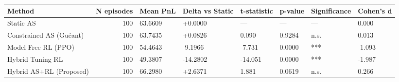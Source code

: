 \begin{tabular}{lrllllll}
\toprule
Method & N episodes & Mean PnL & Delta vs Static & t-statistic & p-value & Significance & Cohen's d \\
\midrule
Static AS & 100 & 63.6609 & +0.0000 & — & — & — & 0.000 \\
Constrained AS (Guéant) & 100 & 63.7435 & +0.0826 & 0.090 & 0.9284 & n.s. & 0.013 \\
Model-Free RL (PPO) & 100 & 54.4643 & -9.1966 & -7.731 & 0.0000 & *** & -1.093 \\
Hybrid Tuning RL & 100 & 49.3807 & -14.2802 & -14.051 & 0.0000 & *** & -1.987 \\
Hybrid AS+RL (Proposed) & 100 & 66.2980 & +2.6371 & 1.881 & 0.0619 & n.s. & 0.266 \\
\bottomrule
\end{tabular}
